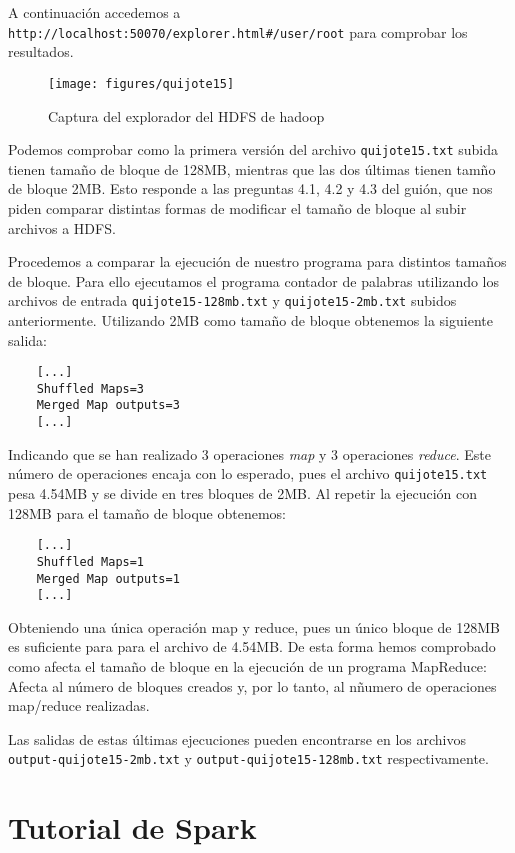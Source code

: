 \documentclass[11pt]{article}
\def\inline{\lstinline[basicstyle=\ttfamily,keywordstyle={}]}
\begin{document}
A continuación accedemos a \inline{http://localhost:50070/explorer.html#/user/root} para comprobar los resultados.

\begin{figure}[H]
  \centering
  \texttt{[image: figures/quijote15]}
  \caption{Captura del explorador del HDFS de hadoop}
\end{figure}

Podemos comprobar como la primera versión del archivo \inline{quijote15.txt} subida tienen tamaño de bloque de 128MB, mientras que las dos últimas tienen tamño de bloque 2MB. Esto responde a las preguntas 4.1, 4.2 y 4.3 del guión, que nos piden comparar distintas formas de modificar el tamaño de bloque al subir archivos a HDFS.

Procedemos a comparar la ejecución de nuestro programa para distintos tamaños de bloque. Para ello ejecutamos el programa contador de palabras utilizando los archivos de entrada \inline{quijote15-128mb.txt} y \inline{quijote15-2mb.txt} subidos anteriormente. Utilizando 2MB como tamaño de bloque obtenemos la siguiente salida:

\begin{verbatim}
	[...]
	Shuffled Maps=3
	Merged Map outputs=3
	[...]
\end{verbatim}

Indicando que se han realizado 3 operaciones \emph{map} y 3 operaciones \emph{reduce}. Este número de operaciones encaja con lo esperado, pues el archivo \inline{quijote15.txt} pesa 4.54MB y se divide en tres bloques de 2MB. Al repetir la ejecución con 128MB para el tamaño de bloque obtenemos:

\begin{verbatim}
	[...]
	Shuffled Maps=1
	Merged Map outputs=1
	[...]
\end{verbatim}

Obteniendo una única operación map y reduce, pues un único bloque de 128MB es suficiente para para el archivo de 4.54MB. De esta forma hemos comprobado como afecta el tamaño de bloque en la ejecución de un programa MapReduce: Afecta al número de bloques creados y, por lo tanto, al nñumero de operaciones map/reduce realizadas.

Las salidas de estas últimas ejecuciones pueden encontrarse en los archivos \inline{output-quijote15-2mb.txt} y \inline{output-quijote15-128mb.txt} respectivamente.


\newpage
\section{ Tutorial de Spark}
\end{document}
